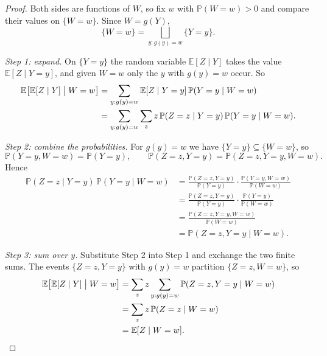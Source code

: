 \begin{proof}
    Both sides are functions of \(W\), so fix \(w\) with \(\mathbb{P}(W = w) > 0\) and compare their values on \(\{ W = w \}\). Since \(W = g(Y)\),
    \[
        \{ W = w \} = \bigsqcup_{y : g(y) = w} \{ Y = y \} .
    \]

    \emph{Step 1: expand.} On \(\{ Y = y \}\) the random variable \(\mathbb{E}[Z \mid Y]\) takes the value \(\mathbb{E}[Z \mid Y = y]\), and given \(W = w\) only the \(y\) with \(g(y) = w\) occur. So
    \begin{align*}
        \mathbb{E}\bigl[ \mathbb{E}[Z \mid Y] \bigm| W = w \bigr]
        &= \sum_{y : g(y) = w} \mathbb{E}[Z \mid Y = y] \, \mathbb{P}(Y = y \mid W = w) \\
        &= \sum_{y : g(y) = w} \sum_{z} z \, \mathbb{P}(Z = z \mid Y = y) \, \mathbb{P}(Y = y \mid W = w) .
    \end{align*}

    \emph{Step 2: combine the probabilities.} For \(g(y) = w\) we have \(\{ Y = y \} \subseteq \{ W = w \}\), so
    \[
        \mathbb{P}(Y = y, W = w) = \mathbb{P}(Y = y),
        \qquad
        \mathbb{P}(Z = z, Y = y) = \mathbb{P}(Z = z, Y = y, W = w) .
    \]
    Hence
    \begin{align*}
        \mathbb{P}(Z = z \mid Y = y) \, \mathbb{P}(Y = y \mid W = w)
        &= \frac{\mathbb{P}(Z = z, Y = y)}{\mathbb{P}(Y = y)} \cdot \frac{\mathbb{P}(Y = y, W = w)}{\mathbb{P}(W = w)} \\
        &= \frac{\mathbb{P}(Z = z, Y = y)}{\mathbb{P}(Y = y)} \cdot \frac{\mathbb{P}(Y = y)}{\mathbb{P}(W = w)} \\
        &= \frac{\mathbb{P}(Z = z, Y = y, W = w)}{\mathbb{P}(W = w)} \\
        &= \mathbb{P}(Z = z, Y = y \mid W = w) .
    \end{align*}

    \emph{Step 3: sum over \(y\).} Substitute Step 2 into Step 1 and exchange the two finite sums. The events \(\{ Z = z, Y = y \}\) with \(g(y) = w\) partition \(\{ Z = z, W = w \}\), so
    \begin{align*}
        \mathbb{E}\bigl[ \mathbb{E}[Z \mid Y] \bigm| W = w \bigr]
        &= \sum_{z} z \sum_{y : g(y) = w} \mathbb{P}(Z = z, Y = y \mid W = w) \\
        &= \sum_{z} z \, \mathbb{P}(Z = z \mid W = w) \\
        &= \mathbb{E}[Z \mid W = w] . \qedhere
    \end{align*}
\end{proof}

